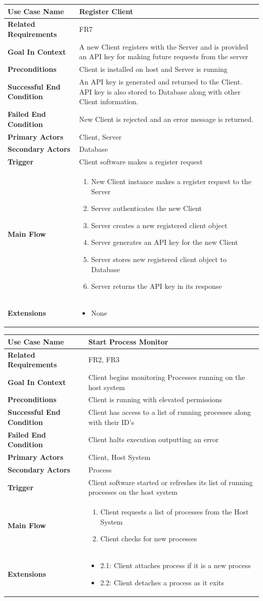 \documentclass[titlepage]{article}
\newcommand{\longUseCase}[3]
{
    \def\tempMainFlow{#1}%
    \def\tempExtension{#2}%
    \usecase#3
}
\newcommand{\usecase}[9]
{
    \begin{table}[H]
        \centering
        \begin{tabularx}{\textwidth}{|X | X|}
        \hline
            \textbf{Use Case Name} & #1\\
        \hline
            \textbf{Related Requirements} & #2\\
        \hline
            \textbf{Goal In Context} & #3\\
        \hline
            \textbf{Preconditions} & #4\\
        \hline
            \textbf{Successful End Condition} & #5\\
        \hline
            \textbf{Failed End Condition} & #6\\
        \hline
            \textbf{Primary Actors} & #7\\
        \hline
            \textbf{Secondary Actors} & #8\\
        \hline
            \textbf{Trigger} & #9\\
        \hline
            \textbf{Main Flow} & \tempMainFlow\\
        \hline
            \textbf{Extensions} & \tempExtension\\
        \hline
        \end{tabularx}
    \end{table}
    
}
\begin{document}
\longUseCase
{
\begin{enumerate}
    \item New Client instance makes a register request to the Server
    \item Server authenticates the new Client
    \item Server creates a new registered client object
    \item Server generates an API key for the new Client
    \item Server stores new registered client object to Database
    \item Server returns the API key in its response
\end{enumerate}
}
{
\begin{itemize}
    \item None
\end{itemize}
}
{
{Register Client}
{FR7}
{A new Client registers with the Server and is provided an API key for making future requests from the server}
{Client is installed on host and Server is running}
{An API key is generated and returned to the Client. API key is also stored to Database along with other Client information.}
{New Client is rejected and an error message is returned.}
{Client, Server}
{Database}
{Client software makes a register request}
}
\longUseCase
{
\begin{enumerate}
    \item Client requests a list of processes from the Host System
    \item Client checks for new processes 
\end{enumerate}
}
{
\begin{itemize}
    \item 2.1: Client attaches process if it is a new process
    \item 2.2: Client detaches a process as it exits
\end{itemize}
}
{
{Start Process Monitor}
{FR2, FR3}
{Client begins monitoring Processes running on the host system}
{Client is running with elevated permissions}
{Client has access to a list of running processes along with their ID's}
{Client halts execution outputting an error}
{Client, Host System}
{Process}
{Client software started or refreshes its list of running processes on the host system}
}
\end{document}
